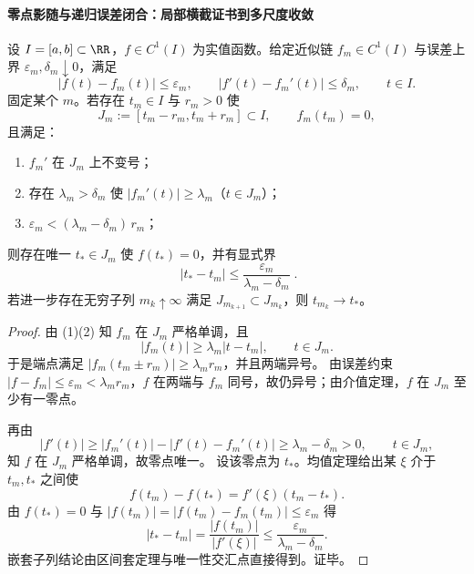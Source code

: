\paragraph{零点影随与递归误差闭合：局部横截证书到多尺度收敛}

\begin{theorem}[递归近似链的零点影随原理与显式定位界]\label{thm:xi-recursive-zero-shadowing-explicit}
设 \(I=[a,b]\subset\RR\)，\(f\in C^1(I)\) 为实值函数。给定近似链 \(f_m\in C^1(I)\) 与误差上界 \(\varepsilon_m,\delta_m\downarrow 0\)，满足
\[
|f(t)-f_m(t)|\le \varepsilon_m,\qquad |f'(t)-f_m'(t)|\le \delta_m,\qquad t\in I.
\]
固定某个 \(m\)。若存在 \(t_m\in I\) 与 \(r_m>0\) 使
\[
J_m:=[t_m-r_m,t_m+r_m]\subset I,\qquad f_m(t_m)=0,
\]
且满足：
\begin{enumerate}
  \item \(f_m'\) 在 \(J_m\) 上不变号；
  \item 存在 \(\lambda_m>\delta_m\) 使 \(|f_m'(t)|\ge \lambda_m\)（\(t\in J_m\)）；
  \item \(\varepsilon_m<(\lambda_m-\delta_m)\,r_m\)；
\end{enumerate}
则存在唯一 \(t_\ast\in J_m\) 使 \(f(t_\ast)=0\)，并有显式界
\[
\boxed{\;
|t_\ast-t_m|\le \frac{\varepsilon_m}{\lambda_m-\delta_m}\; }.
\]
若进一步存在无穷子列 \(m_k\uparrow\infty\) 满足 \(J_{m_{k+1}}\subset J_{m_k}\)，则 \(t_{m_k}\to t_\ast\)。
\end{theorem}
\begin{proof}
由 (1)(2) 知 \(f_m\) 在 \(J_m\) 严格单调，且
\[
|f_m(t)|\ge \lambda_m|t-t_m|,\qquad t\in J_m.
\]
于是端点满足 \(|f_m(t_m\pm r_m)|\ge \lambda_m r_m\)，并且两端异号。
由误差约束 \(|f-f_m|\le\varepsilon_m<\lambda_m r_m\)，\(f\) 在两端与 \(f_m\) 同号，故仍异号；由介值定理，\(f\) 在 \(J_m\) 至少有一零点。
\par
再由
\[
|f'(t)|\ge |f_m'(t)|-|f'(t)-f_m'(t)|\ge \lambda_m-\delta_m>0,\qquad t\in J_m,
\]
知 \(f\) 在 \(J_m\) 严格单调，故零点唯一。
设该零点为 \(t_\ast\)。均值定理给出某 \(\xi\) 介于 \(t_m,t_\ast\) 之间使
\[
f(t_m)-f(t_\ast)=f'(\xi)(t_m-t_\ast).
\]
由 \(f(t_\ast)=0\) 与 \(|f(t_m)|=|f(t_m)-f_m(t_m)|\le\varepsilon_m\) 得
\[
|t_\ast-t_m|
=\frac{|f(t_m)|}{|f'(\xi)|}
\le \frac{\varepsilon_m}{\lambda_m-\delta_m}.
\]
嵌套子列结论由区间套定理与唯一性交汇点直接得到。证毕。
\end{proof}

